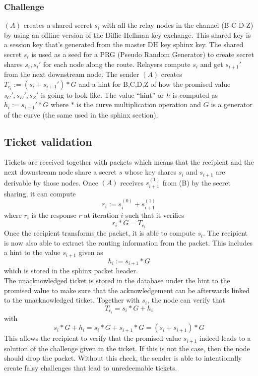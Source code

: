 \subsubsection{Challenge}
$(A)$ creates a shared secret $s_i$ with all the relay nodes in the channel (B-C-D-Z) by using an offline version of the Diffie-Hellman key exchange. This shared key is a session key that's generated from the master DH key sphinx key. 
\newline The shared secret $s_i$ is used as a seed for a PRG (Pseudo Random Generator) to create secret shares $s_i,s_i'$ for each node along the route. 
Relayers compute $s_i$ and get $s_{i+1}'$ from the next downstream node. 
\newline The sender $(A)$ creates $T_{c_i}:=(s_i+s_{i+1}')*G$ and a hint for B,C,D,Z of how the promised value $s_C',s_D',s_Z'$ is going to look like. 
The value “hint” or $h$ is computed as $h_i:=s_{i+1}'*G$ where $*$ is the curve multiplication operation and $G$ is a generator of the curve (the same used in the sphinx section).


\subsection{Ticket validation}
Tickets are received together with packets which means that the recipient and the next downstream node share a secret $s$ whose key shares $s_i$ and $s_{i+1}$ are derivable by those nodes.
\newline Once $(A)$ receives $s_{i+1}^{(1)}$ from (B) by the secret sharing, it can compute $$r_i:=s_i^{(0)}+s_{i+1}^{(1)}$$ where $r_i$ is the response $r$ at iteration $i$ such that it verifies  
$$r_i*G=T_{c_i}$$
Once the recipient transforms the packet, it is able to compute $s_i$. The recipient is now also able to extract the routing information from the packet. 
This includes a hint to the value $s_{i+1}$ given as $$h_i:=s_{i+1}*G$$ which is stored in the sphinx packet header.
\\The unacknowledged ticket is stored in the database under the hint to the promised value to make sure that the acknowledgement can be afterwards linked to the unacknowledged ticket.
\newline Together with $s_i$, the node can verify that $$T_{c_i}=s_i*G+h_i$$ with $$s_i*G+h_i=s_i*G+s_{i+1}*G=(s_i+s_{i+1})*G$$ 
This allows the recipient to verify that the promised value $s_{i+1}$ indeed leads to a solution of the challenge given in the ticket. 
If this is not the case, then the node should drop the packet.
\newline Without this check, the sender is able to intentionally create falsy challenges that lead to unredeemable tickets.


